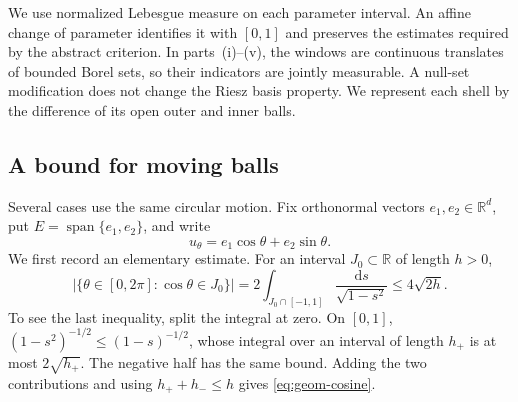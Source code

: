 \documentclass[12pt,reqno,tbtags]{amsart}
\def\R{\mathbb{R}}
\def\d{\mathrm{d}}
\newcommand\1{\mathbbm{1}}
\def\d{\mathrm{d}}
\begin{document}
We use normalized Lebesgue measure on each parameter interval. An affine
change of parameter identifies it with $[0,1]$ and preserves the estimates
required by the abstract criterion. In parts~(i)--(v), the windows are continuous translates
of bounded Borel sets, so their indicators are jointly measurable.
A null-set modification does not change the Riesz basis property.
We represent each shell by the difference of its open outer and inner balls.

\subsection{A bound for moving balls}

Several cases use the same circular motion. Fix orthonormal vectors
$e_1,e_2\in\R^d$, put $E=\operatorname{span}\{e_1,e_2\}$, and write
\begin{equation*}
    u_\theta=e_1\cos\theta+e_2\sin\theta.
\end{equation*}
We first record an elementary estimate. For an interval $J_0\subset\R$
of length $h>0$,
\begin{equation}\label{eq:geom-cosine}
    \bigl|\{\theta\in[0,2\pi]:\cos\theta\in J_0\}\bigr|
    =2\int_{J_0\cap[-1,1]}\frac{\d s}{\sqrt{1-s^2}}
    \le4\sqrt{2h}.
\end{equation}
To see the last inequality, split the integral at zero. On $[0,1]$,
$(1-s^2)^{-1/2}\le(1-s)^{-1/2}$, whose integral over an interval of length
$h_+$ is at most $2\sqrt{h_+}$. The negative half has the same bound.
Adding the two contributions and using $h_++h_-\le h$ gives
\eqref{eq:geom-cosine}.
\end{document}
